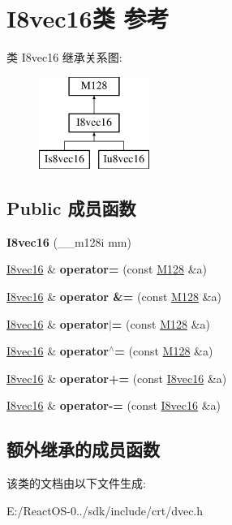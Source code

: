 \hypertarget{class_i8vec16}{}\section{I8vec16类 参考}
\label{class_i8vec16}
类 I8vec16 继承关系图\+:\begin{figure}[H]
\begin{center}
\leavevmode
\includegraphics[height=3.000000cm]{class_i8vec16}
\end{center}
\end{figure}
\subsection*{Public 成员函数}
\begin{DoxyCompactItemize}
\item 
\mbox{\label{class_i8vec16_a74f4244df08b3e314f7f46ac08939001}} 
{\bfseries I8vec16} (\+\_\+\+\_\+m128i mm)
\item 
\mbox{\label{class_i8vec16_a45cbe56aad6ab6d4c3d09c44f9570f35}} 
\hyperlink{class_i8vec16}{I8vec16} \& {\bfseries operator=} (const \hyperlink{class_m128}{M128} \&a)
\item 
\mbox{\label{class_i8vec16_aac67d85990c2e9eaf432f23efcd2f2ac}} 
\hyperlink{class_i8vec16}{I8vec16} \& {\bfseries operator \&=} (const \hyperlink{class_m128}{M128} \&a)
\item 
\mbox{\label{class_i8vec16_a471297fac7fd4ac850979d620d95d134}} 
\hyperlink{class_i8vec16}{I8vec16} \& {\bfseries operator$\vert$=} (const \hyperlink{class_m128}{M128} \&a)
\item 
\mbox{\label{class_i8vec16_ada4ab27ef0d540354d22acd3202c140e}} 
\hyperlink{class_i8vec16}{I8vec16} \& {\bfseries operator$^\wedge$=} (const \hyperlink{class_m128}{M128} \&a)
\item 
\mbox{\label{class_i8vec16_a670f38fc3694a14efdbf291cfa0827c4}} 
\hyperlink{class_i8vec16}{I8vec16} \& {\bfseries operator+=} (const \hyperlink{class_i8vec16}{I8vec16} \&a)
\item 
\mbox{\label{class_i8vec16_a571fdd2be8c8906b7c0bdc34158d4b7a}} 
\hyperlink{class_i8vec16}{I8vec16} \& {\bfseries operator-\/=} (const \hyperlink{class_i8vec16}{I8vec16} \&a)
\end{DoxyCompactItemize}
\subsection*{额外继承的成员函数}


该类的文档由以下文件生成\+:\begin{DoxyCompactItemize}
\item 
E\+:/\+React\+O\+S-\/0../sdk/include/crt/dvec.\+h\end{DoxyCompactItemize}
